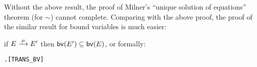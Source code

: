 Without the above result, the proof of Milner's ``unique solution of
equations'' theorem (for $\sim$) cannot complete. Comparing with the
above proof, the proof of the similar result for bound variables is much easier:
\begin{proposition}
\label{prop:transBV}
if $E \arr{\mu} E'$ then ${{\rm\sf{bv}}}(E') \subseteq {{\rm\sf{bv}}}(E)$, or formally:
\begin{alltt}
\HOLTokenTurnstile{} \HOLSymConst{\HOLTokenForall{}}  .  \HOLTokenTransBegin{}\HOLTokenTransEnd {} \HOLSymConst{\HOLTokenImp{}}   \HOLSymConst{\HOLTokenSubset{}}  \hfill{[TRANS_BV]}
\end{alltt}
\end{proposition}
